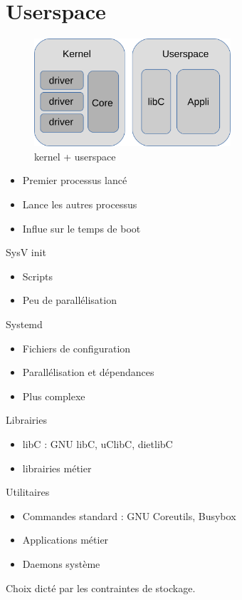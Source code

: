 \section{Userspace}
	\begin{frame}
		\begin{figure}
		\includegraphics[height=4cm]{img/arch_linux_full.png}
		\caption{kernel + userspace}
		\end{figure}
	\end{frame}
	\begin{frame}
		\begin{itemize}
			\item Premier processus lancé
			\item Lance les autres processus
			\item Influe sur le temps de boot
		\end{itemize}
		\begin{block}{SysV init}
			\begin{itemize}
				\item Scripts
				\item Peu de parallélisation
			\end{itemize}
		\end{block}
		\begin{block}{Systemd}
			\begin{itemize}
				\item Fichiers de configuration
				\item Parallélisation et dépendances
				\item Plus complexe
			\end{itemize}
		\end{block}
	\end{frame}

	\begin{frame}
		\begin{block}{Librairies}
			\begin{itemize}
				\item libC : GNU libC, uClibC, dietlibC
				\item librairies métier
			\end{itemize}
		\end{block}
		\begin{block}{Utilitaires}
			\begin{itemize}
				\item Commandes standard : GNU Coreutils, Busybox
				\item Applications métier
				\item Daemons système
			\end{itemize}
		\end{block}
	Choix dicté par les contraintes de stockage.
	\end{frame}

